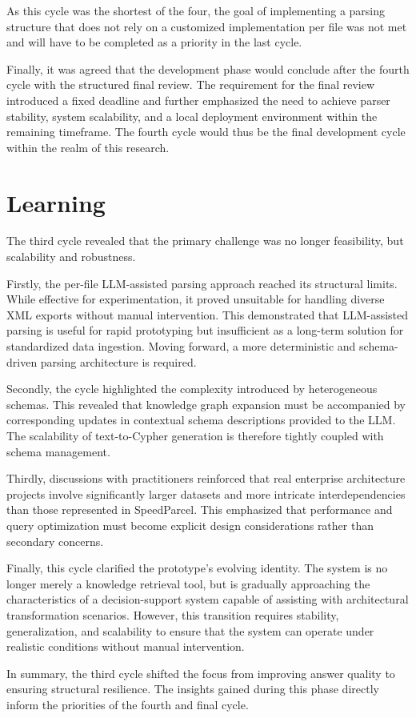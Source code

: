 As this cycle was the shortest of the four, the goal of implementing a parsing structure that does not rely on a customized implementation per file was not met and will have to be completed as a priority in the last cycle.

Finally, it was agreed that the development phase would conclude after the fourth cycle with the structured final review. The requirement for the final review introduced a fixed deadline and further emphasized the need to achieve parser stability, system scalability, and a local deployment environment within the remaining timeframe. The fourth cycle would thus be the final development cycle within the realm of this research.

\section{Learning}
\label{sec:cycle3_learning}
The third cycle revealed that the primary challenge was no longer feasibility, but scalability and robustness.

Firstly, the per-file LLM-assisted parsing approach reached its structural limits. While effective for experimentation, it proved unsuitable for handling diverse XML exports without manual intervention. This demonstrated that LLM-assisted parsing is useful for rapid prototyping but insufficient as a long-term solution for standardized data ingestion. Moving forward, a more deterministic and schema-driven parsing architecture is required.

Secondly, the cycle highlighted the complexity introduced by heterogeneous schemas. This revealed that knowledge graph expansion must be accompanied by corresponding updates in contextual schema descriptions provided to the LLM. The scalability of text-to-Cypher generation is therefore tightly coupled with schema management.

Thirdly, discussions with practitioners reinforced that real enterprise architecture projects involve significantly larger datasets and more intricate interdependencies than those represented in SpeedParcel. This emphasized that performance and query optimization must become explicit design considerations rather than secondary concerns.

Finally, this cycle clarified the prototype's evolving identity. The system is no longer merely a knowledge retrieval tool, but is gradually approaching the characteristics of a decision-support system capable of assisting with architectural transformation scenarios. However, this transition requires stability, generalization, and scalability to ensure that the system can operate under realistic conditions without manual intervention.

In summary, the third cycle shifted the focus from improving answer quality to ensuring structural resilience. The insights gained during this phase directly inform the priorities of the fourth and final cycle.



